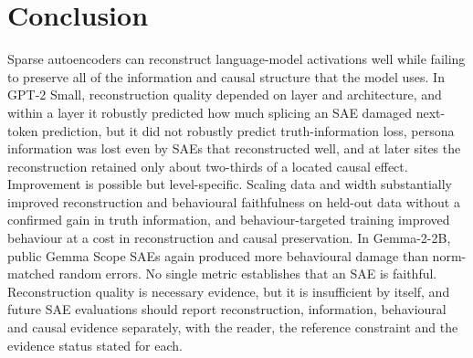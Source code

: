 \section{Conclusion}\label{sec:conclusion}

Sparse autoencoders can reconstruct language-model activations well while failing to preserve all of the information
and causal structure that the model uses. In GPT-2 Small, reconstruction quality depended on layer and architecture,
and within a layer it robustly predicted how much splicing an SAE damaged next-token prediction, but it did not robustly
predict truth-information loss, persona information was lost even by SAEs that reconstructed well, and at later sites
the reconstruction retained only about two-thirds of a located causal effect. Improvement is possible but
level-specific. Scaling data and width substantially improved reconstruction and behavioural faithfulness on held-out
data without a confirmed gain in truth information, and behaviour-targeted training improved behaviour at a cost in
reconstruction and causal preservation. In Gemma-2-2B, public Gemma Scope SAEs again produced more behavioural damage
than norm-matched random errors. No single metric establishes that an SAE is faithful. Reconstruction quality is
necessary evidence, but it is insufficient by itself, and future SAE evaluations should report reconstruction,
information, behavioural and causal evidence separately, with the reader, the reference constraint and the evidence
status stated for each.
